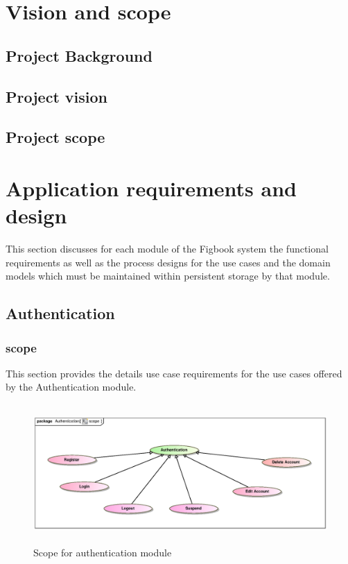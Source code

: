 \documentclass[12pt]{article}
\begin{document}


\newpage
\tableofcontents

\newpage
\listoffigures

\newpage

\section{Vision and scope}

\subsection{Project Background}

\subsection{Project vision}

\subsection{Project scope}

\newpage
\section{Application requirements and design}
\par{This section discusses for each module of the Figbook system the functional requirements
as well as the process designs for the use cases and the domain models which must be maintained
within persistent storage by that module.
}

\subsection{Authentication}

\subsubsection{scope}
\par{This section provides the details use case requirements for the use cases offered by the Authentication
module.}
\begin{figure}[h]
	\includegraphics[height=200px, width=500px]{epsImages/Authentication/AuthenticationScope.eps}
	\caption{Scope for authentication module}
\end{figure}
\end{document}

